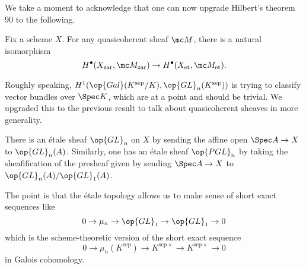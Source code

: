 \documentclass[../notes.tex]{subfiles}
\begin{document}
We take a moment to acknowledge that one can now upgrade Hilbert's theorem 90 to the following.
\begin{theorem}
	Fix a scheme $X$. For any quasicoherent sheaf $\mc M$, there is a natural isomorphism
	\[H^\bullet(X_{\mathrm{zar}},\mc M_{\mathrm{zar}})\to H^\bullet(X_{\mathrm{et}},\mc M_{\mathrm{et}}).\]
\end{theorem}
Roughly speaking, $H^1(\op{Gal}(K^{\mathrm{sep}}/K),\op{GL}_n(K^{\mathrm{sep}}))$ is trying to classify vector bundles over $\Spec K$, which are at a point and should be trivial. We upgraded this to the previous result to talk about quasicoherent sheaves in more generality.
\begin{example}
	There is an \'etale sheaf $\op{GL}_n$ on $X$ by sending the affine open $\Spec A\to X$ to $\op{GL}_n(A)$. Similarly, one has an \'etale sheaf $\op{PGL}_n$ by taking the sheafification of the presheaf given by sending $\Spec A\to X$ to $\op{GL}_n(A)/\op{GL}_1(A)$.
\end{example}
The point is that the \'etale topology allows us to make sense of short exact sequences like
\[0\to\mu_n\to{\op{GL}_1}\to{\op{GL}_1}\to0\]
which is the scheme-theoretic version of the short exact sequence
\[0\to\mu_n(K^{\mathrm{sep}})\to K^{\mathrm{sep}\times}\to K^{\mathrm{sep}\times}\to0\]
in Galois cohomology.
\end{document}
